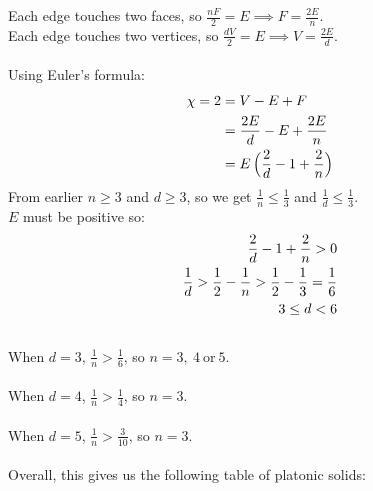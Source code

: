 \documentclass{article}
\newcommand\ifrac[2]{{\displaystyle\frac{#1}{#2}}}
\begin{document}
Each edge touches two faces, so $\ifrac{nF}{2} = E \implies F = \ifrac{2E}{n}$.\\
Each edge touches two vertices, so $\ifrac{dV}{2} = E \implies V = \ifrac{2E}{d}$.\\\\
Using Euler's formula:
\begin{equation}
    \begin{split}
    \chi = 2 &= V - E + F\\
             &= \frac{2E}{d} - E + \frac{2E}{n}\\
             &= E \, \Bigl(\frac2d - 1 + \frac2n \Bigr)
    \end{split}
    \notag
\end{equation}
From earlier $n \ge 3$ and $d \ge 3$, so we get $\ifrac1n \le \ifrac13$ and $\ifrac1d \le \ifrac13$.\\
$E$ must be positive so:
\begin{align}
    \frac2d - 1 + \frac2n > 0
    \notag
    \\
    \frac1d> \frac12 - \frac1n > \frac12 - \frac13 = \frac16
    \notag
    \\
    3 \le d < 6
    \notag
\end{align}
\\
When $d = 3$, $\ifrac1n > \ifrac16$, so $n = 3,\: 4 \: \text{or} \: 5$.\\\\
When $d = 4$, $\ifrac1n > \ifrac14$, so $n = 3$.\\\\
When $d = 5$, $\ifrac1n > \ifrac{3}{10}$, so $n = 3$.\\\\

Overall, this gives us the following table of platonic solids:
\end{document}
